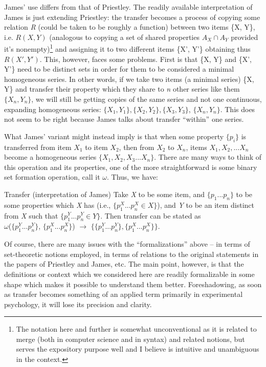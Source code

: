 \documentclass{article}
\begin{document}
James’ use differs from that of Priestley. The readily available interpretation of James is just extending Priestley: the transfer becomes a process of copying some relation \textit{R} (could be taken to be roughly a function) between two items \{X, Y\}, i.e. \(R(X, Y)\) (analogous to copying a set of shared properties \(A_X \cap A_Y\) provided it's nonempty)\footnote{The notation here and further is somewhat unconventional as it is related to merge (both in computer science and in syntax) and related notions, but serves the expository purpose well and I believe is intuitive and unambiguous in the context.} and assigning it to two different items \{X', Y'\} obtaining thus \(R(X', Y')\). This, however, faces some problems. First is that \{X, Y\} and \{X', Y'\} need to be distinct sets in order for them to be considered a minimal homogeneous series. In other words, if we take two items (a minimal series) \{X, Y\} and transfer their property which they share to \textit{n} other series like them $\{X_n, Y_n\}$, we will still be getting copies of the same series and not one continuous, expanding homogeneous series: $\{X_1, Y_1\}, \{X_2, Y_2\}, \{X_3, Y_3\}$, $\{X_n, Y_n\}$. This does not seem to be right because James talks about transfer ``within'' one series.

What James’ variant might instead imply is that when some property $\{p_i\}$ is transferred from item $X_1$ to item $X_2$, then from $X_2$ to $X_n$, items $X_1, X_2, ...X_n$ become a homogeneous series $\{X_1, X_2, X_3... X_n\}$. There are many ways to think of this operation and its properties, one of the more straightforward is some binary set formation operation, call it $\omega$. Thus, we have:


\pex Transfer (interpretation of James)
\a Take \textit{X} to be some item, and $\{p_1...p_n\}$ to be some properties which \textit{X} has (i.e., $\{p_1^X...p_n^X \in X\}$), and \textit{Y} to be an item distinct from \textit{X} such that $\{p_1^Y...p_n^Y \in Y\}$.
\a Then transfer can be stated as\\ $\omega$($\{p^Y_1...p^Y_n\}$, $\{p^X_1...p^X_n\}$) $\rightarrow$ $\{\{p^Y_1...p^Y_n\}, \{p^X_1...p^X_n\}\}$.
\xe

Of course, there are many issues with the ``formalizations'' above -- in terms of set-theoretic notions employed, in terms of relations to the original statements in the papers of Priestley and James, etc. The main point, however, is that the definitions or context which we considered here are readily formalizable in some shape which makes it possible to understand them better. Foreshadowing, as soon as transfer becomes something of an applied term primarily in experimental psychology, it will lose its precision and clarity. 
\end{document}
